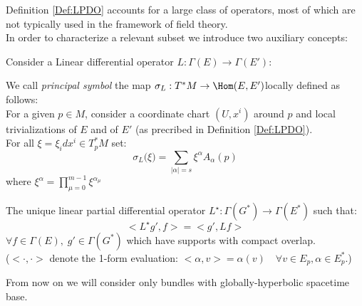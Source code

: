 \documentclass[Main]{subfiles}
\begin{document}
		Definition \ref{Def:LPDO} accounts for a large class of operators, most of which are not typically used in the framework of field theory.\\
		In order to characterize a relevant subset we introduce two auxiliary concepts:
		
			Consider a Linear differential operator $L: \Gamma(E) \rightarrow \Gamma(E')$:
			\begin{definition}
			 	We call \emph{principal symbol} the map $\sigma_L: T^*M \rightarrow \Hom(E,E') $locally defined as follows: \\
			 	For a given $p\in M$, consider a coordinate chart $(U, x^i)$ around $p$ and local trivializations of $E$ and of $E'$ (as precribed in Definition \ref{Def:LPDO}).
			 	\\ 
			 	For all $\xi = \xi_i dx^i \in T^*_pM$ set:
			 	\begin{displaymath}
			 		\sigma_L \big(\xi \big) = \sum_{|\alpha|=s}  \xi^\alpha A_\alpha (p) 
			 	\end{displaymath}
			 	where $ \xi^\alpha = \prod_{\mu=0}^{m-1} \xi^{\alpha_\mu}$
			 \end{definition}
			\begin{definition}
				The unique linear partial differential operator $L^\star: \Gamma(G^*) \rightarrow \Gamma(E^*)$ such that:
				\begin{displaymath}
					<L^\star g' , f > = <g', L f> 
				\end{displaymath}
				$\forall f\in \Gamma(E),\; g' \in \Gamma(G^*)$ which have supports with compact overlap.
				\\
				($<\cdot,\cdot>$ denote the 1-form evaluation: $<\alpha,v>= \alpha(v) \quad \forall v\in E_p, \alpha \in E^*_p$.)
			\end{definition}
			\begin{NB}
			
				From now on we will consider only bundles with globally-hyperbolic spacetime base.
			\end{NB}			
		
\end{document}
